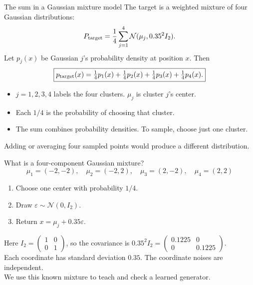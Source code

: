 \documentclass[aspectratio=169,11pt]{beamer}
\begin{document}
\begin{frame}{The sum in a Gaussian mixture model}
The target is a weighted mixture of four Gaussian distributions:
\[P_{\rm target}=\frac14\sum_{j=1}^4\mathcal N(\mu_j,0.35^2I_2).\]
Let $p_j(x)$ be Gaussian $j$'s probability density at position $x$. Then
\[\boxed{p_{\rm target}(x)=\tfrac14p_1(x)+\tfrac14p_2(x)
+\tfrac14p_3(x)+\tfrac14p_4(x).}\]
\begin{itemize}\setlength\itemsep{2mm}
\item $j=1,2,3,4$ labels the four clusters. $\mu_j$ is cluster $j$'s center.
\item Each $1/4$ is the probability of choosing that cluster.
\item The sum combines probability densities. To sample, choose just one cluster.
\end{itemize}
\vspace{2mm}
Adding or averaging four sampled points would produce a different distribution.
\end{frame}

\begin{frame}{What is a four-component Gaussian mixture?}
\[\mu_1=(-2,-2),\quad\mu_2=(-2,2),\quad
\mu_3=(2,-2),\quad\mu_4=(2,2)\]
\vspace{1mm}
\begin{enumerate}\setlength\itemsep{2mm}
\item Choose one center with probability $1/4$.
\item Draw $\varepsilon\sim\mathcal N(0,I_2)$.
\item Return $x=\mu_j+0.35\varepsilon$.
\end{enumerate}
\vspace{3mm}
Here $I_2=\begin{pmatrix}1&0\\0&1\end{pmatrix}$, so the covariance is
$0.35^2I_2=\begin{pmatrix}0.1225&0\\0&0.1225\end{pmatrix}$.\\[3mm]
Each coordinate has standard deviation $0.35$. The coordinate noises are independent.\\[3mm]
We use this known mixture to teach and check a learned generator.
\end{frame}
\end{document}
